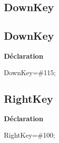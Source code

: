 \documentclass{report}
\newif\ifpdf
\begin{document}
\subsection*{\large{\textbf{DownKey}}\normalsize\hspace{1ex}\hrulefill}
\else
\subsection*{DownKey}
\fi
\label{Types-DownKey}
\begin{list}{}{
\setlength{\itemindent}{0cm}
\setlength{\listparindent}{0cm}
\setlength{\leftmargin}{\evensidemargin}
\addtolength{\leftmargin}{\tmplength}
\settowidth{\labelsep}{X}
\addtolength{\leftmargin}{\labelsep}
\setlength{\labelwidth}{\tmplength}
}
\item[\textbf{Déclaration}\hfill]
\ifpdf
\begin{flushleft}
\fi
\begin{ttfamily}
DownKey={\#}115;\end{ttfamily}

\ifpdf
\end{flushleft}
\fi

\end{list}
\ifpdf
\subsection*{\large{\textbf{RightKey}}\normalsize\hspace{1ex}\hrulefill}
\else
\subsection*{RightKey}
\fi
\label{Types-RightKey}
\begin{list}{}{
\setlength{\itemindent}{0cm}
\setlength{\listparindent}{0cm}
\setlength{\leftmargin}{\evensidemargin}
\addtolength{\leftmargin}{\tmplength}
\settowidth{\labelsep}{X}
\addtolength{\leftmargin}{\labelsep}
\setlength{\labelwidth}{\tmplength}
}
\item[\textbf{Déclaration}\hfill]
\ifpdf
\begin{flushleft}
\fi
\begin{ttfamily}
RightKey={\#}100;\end{ttfamily}

\ifpdf
\end{flushleft}
\fi

\end{list}
\ifpdf
\end{document}
